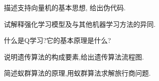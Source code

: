 \begin{think}
    描述支持向量机的基本思想, 给出伪代码.
\end{think}

\begin{think}
    试解释强化学习模型及与其他机器学习方法的异同.
\end{think}
\begin{think}
    什么是Q学习?它的基本原理是什么?
\end{think}
\begin{think}
    说明遗传算法的构成要素,给出遗传算法流程图.
\end{think}

\begin{think}
    简述蚁群算法的原理,用蚁群算法求解旅行商问题.
\end{think}


